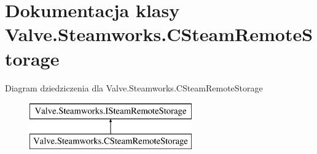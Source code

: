 \hypertarget{class_valve_1_1_steamworks_1_1_c_steam_remote_storage}{}\section{Dokumentacja klasy Valve.\+Steamworks.\+C\+Steam\+Remote\+Storage}
\label{class_valve_1_1_steamworks_1_1_c_steam_remote_storage}
Diagram dziedziczenia dla Valve.\+Steamworks.\+C\+Steam\+Remote\+Storage\begin{figure}[H]
\begin{center}
\leavevmode
\includegraphics[height=2.000000cm]{class_valve_1_1_steamworks_1_1_c_steam_remote_storage}
\end{center}
\end{figure}
